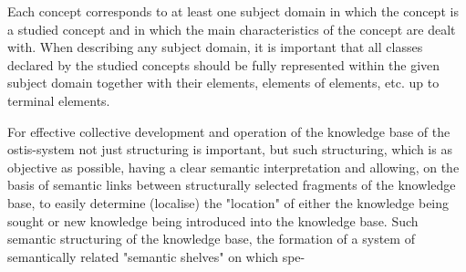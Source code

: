 \documentclass{scndocument}
\begin{document}
\begin{multicols}{2}
    Each concept corresponds to at least one subject domain in which the concept is a studied concept and in which the main characteristics of the concept are dealt with. When describing any subject domain, it is important that all classes declared by the studied concepts should be fully represented within the given subject domain together with their elements, elements of elements, etc. up to terminal elements.

    For effective collective development and operation of the knowledge base of the ostis-system not just structuring is important, but such structuring, which is as objective as possible, having a clear semantic interpretation and allowing, on the basis of semantic links between
structurally selected fragments of the knowledge base, to easily determine (localise) the "location" of either the knowledge being sought or new knowledge being introduced into the knowledge base. Such semantic structuring of the knowledge base, the formation of a system of semantically related "semantic shelves" on which spe-
\end{multicols}

\newpage
\end{document}
